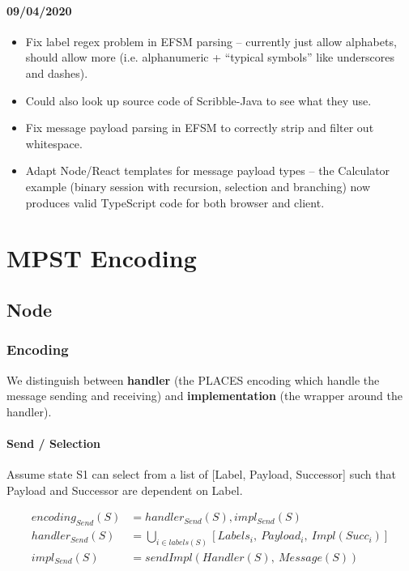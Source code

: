 \documentclass{article}
\begin{document}
\paragraph{09/04/2020}
\begin{itemize}
\item
Fix label regex problem in EFSM parsing -- currently just
allow alphabets, should allow more (i.e. alphanumeric
+ ``typical symbols'' like underscores and dashes).

\item
Could also look up source code of Scribble-Java to see what they use.

\item
Fix message payload parsing in EFSM to correctly strip and filter out whitespace.

\item
Adapt Node/React templates for message payload types -- the Calculator example
(binary session with recursion, selection and branching) now produces valid TypeScript
code for both browser and client.

\end{itemize}

\section{MPST Encoding}

\subsection{Node}

\subsubsection{Encoding}
We distinguish between \textbf{handler} (the PLACES encoding which handle the
message sending and receiving) and \textbf{implementation} (the wrapper around the handler).

\paragraph{Send / Selection}
Assume state S1 can select from a list of [Label, Payload, Successor] such that Payload and Successor
are dependent on Label.

\begin{align}
encoding_{Send}(S) &= handler_{Send}(S), impl_{Send}(S) \\
handler_{Send}(S) &= \bigcup_{i \in labels(S)} [Labels_i,~Payload_i,~Impl(Succ_i)] \\
impl_{Send}(S) &= sendImpl(Handler(S),~Message(S))
\end{align}
\end{document}
